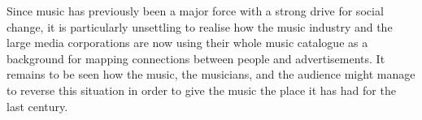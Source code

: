 
Since music has previously been a major force with a strong drive for social change, it is particularly unsettling to realise how the music industry and the large media corporations are now using their whole music catalogue as a background for mapping connections between people and advertisements.  
It remains to be seen how the music, the musicians, and the audience might manage to reverse this situation in order to give the music the place it has had for the last century. 























